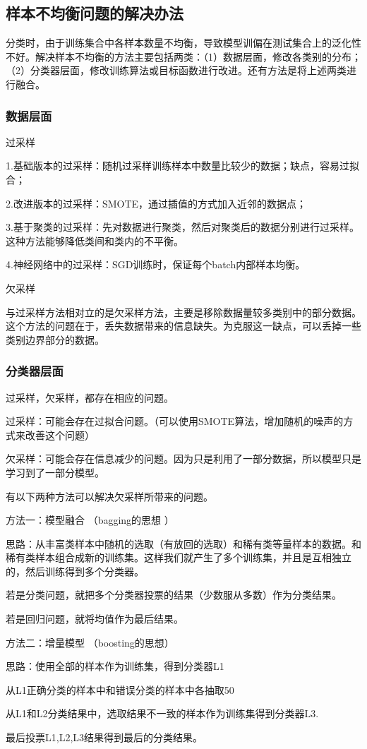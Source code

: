 \documentclass[18pt,a4paper,oneside,UTF8]{ctexart}
\begin{document}
\subsection{样本不均衡问题的解决办法}
分类时，由于训练集合中各样本数量不均衡，导致模型训偏在测试集合上的泛化性不好。解决样本不均衡的方法主要包括两类：（1）数据层面，修改各类别的分布；（2）分类器层面，修改训练算法或目标函数进行改进。还有方法是将上述两类进行融合。
\subsubsection{数据层面}

过采样

    1.基础版本的过采样：随机过采样训练样本中数量比较少的数据；缺点，容易过拟合；

    2.改进版本的过采样：SMOTE，通过插值的方式加入近邻的数据点；

    3.基于聚类的过采样：先对数据进行聚类，然后对聚类后的数据分别进行过采样。这种方法能够降低类间和类内的不平衡。

    4.神经网络中的过采样：SGD训练时，保证每个batch内部样本均衡。

    欠采样

与过采样方法相对立的是欠采样方法，主要是移除数据量较多类别中的部分数据。这个方法的问题在于，丢失数据带来的信息缺失。为克服这一缺点，可以丢掉一些类别边界部分的数据。
\subsubsection{分类器层面}
过采样，欠采样，都存在相应的问题。

过采样：可能会存在过拟合问题。（可以使用SMOTE算法，增加随机的噪声的方式来改善这个问题）

欠采样：可能会存在信息减少的问题。因为只是利用了一部分数据，所以模型只是学习到了一部分模型。

有以下两种方法可以解决欠采样所带来的问题。

方法一：模型融合 （bagging的思想 ）

思路：从丰富类样本中随机的选取（有放回的选取）和稀有类等量样本的数据。和稀有类样本组合成新的训练集。这样我们就产生了多个训练集，并且是互相独立的，然后训练得到多个分类器。

若是分类问题，就把多个分类器投票的结果（少数服从多数）作为分类结果。

若是回归问题，就将均值作为最后结果。

方法二：增量模型 （boosting的思想）

思路：使用全部的样本作为训练集，得到分类器L1

从L1正确分类的样本中和错误分类的样本中各抽取50%

从L1和L2分类结果中，选取结果不一致的样本作为训练集得到分类器L3.

最后投票L1,L2,L3结果得到最后的分类结果。
\end{document}
